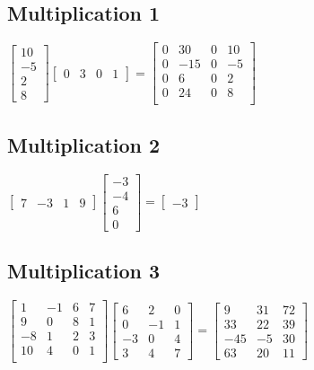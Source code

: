 \documentclass{article}
\begin{document}
\subsection{Multiplication 1}
$\begin{bmatrix}
10 \\ -5 \\ 2  \\ 8
\end{bmatrix}\begin{bmatrix}
0 & 3 & 0 & 1
\end{bmatrix}=\begin{bmatrix}
0 & 30 & 0 & 10 \\
0 & -15 & 0 & -5 \\
0 & 6 & 0 & 2 \\
0 & 24 & 0 & 8 \\
\end{bmatrix}$

\subsection{Multiplication 2}
$\begin{bmatrix}
7 & -3 & 1 & 9
\end{bmatrix}\begin{bmatrix}
-3 \\ -4 \\ 6 \\ 0\end{bmatrix}=\begin{bmatrix}-3\end{bmatrix}$

\subsection{Multiplication 3}
$\begin{bmatrix}
1 & -1 & 6 & 7 \\
9 & 0 & 8 & 1 \\
-8 & 1 & 2 & 3 \\
10 & 4 & 0 & 1 \\
\end{bmatrix}\begin{bmatrix}
6 & 2 & 0 \\
0 & -1 & 1 \\
-3 & 0 & 4 \\
3 & 4 & 7
\end{bmatrix}=\begin{bmatrix}
9 & 31 & 72 \\
33 & 22 & 39 \\
-45 & -5 & 30 \\
63 & 20 & 11
\end{bmatrix}$
\end{document}
